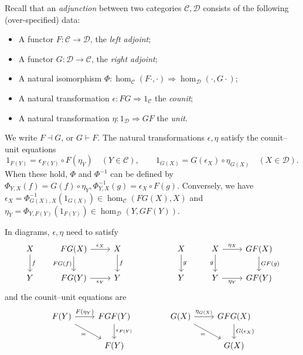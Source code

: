 \documentclass[a4paper,11pt]{article}
\theoremstyle{plain}
\theoremstyle{remark}
\newcommand{\mc}[1]{\mathcal{#1}}
\begin{document}
Recall that an \emph{adjunction} between two categories $\mc C, \mc D$ consists of the following (over-specified) data:
\begin{itemize}
  \item A functor $F\colon\mc C\to\mc D$, the \emph{left adjoint};
  \item A functor $G\colon\mc D \to \mc C$, the \emph{right adjoint};
  \item A natural isomorphism $\Phi \colon \hom_{\mc C}(F\cdot, \cdot) \Rightarrow \hom_{\mc D}(\cdot, G\cdot)$;
  \item A natural transformation $\epsilon \colon FG \Rightarrow 1_{\mc C}$ the \emph{counit};
  \item A natural transformation $\eta \colon 1_{\mc D} \Rightarrow GF$ the \emph{unit}.
\end{itemize}
We write $F \dashv G$, or $G \vdash F$.
The natural transformations $\epsilon, \eta$ satisfy the counit--unit equations
\[ 1_{F(Y)} = \epsilon_{F(Y)} \circ F(\eta_Y) \quad (Y\in \mc C), \qquad
1_{G(X)} = G(\epsilon_X) \circ \eta_{G(X)} \quad (X\in\mc D). \]
When these hold, $\Phi$ and $\Phi^{-1}$ can be defined by $\Phi_{Y,X}(f) = G(f)\circ\eta_Y, \Phi^{-1}_{Y,X}(g) = \epsilon_X\circ F(g)$.  Conversely, we have $\epsilon_X = \Phi^{-1}_{G(X), X}(1_{G(X)}) \in \hom_{\mc C}(FG(X), X)$ and $\eta_Y = \Phi_{Y,F(Y)}(1_{F(Y)}) \in \hom_{\mc D}(Y, GF(Y))$.

In diagrams, $\epsilon,\eta$ need to satisfy
\[ \begin{tikzcd}
X \arrow[d, "f"]    &
FG(X) \arrow[r, "\epsilon_X"] \arrow[d, "FG(f)"'] & X \arrow[d, "f"]
\\
Y    &
FG(Y) \arrow[r, "\epsilon_Y"']  & Y
\end{tikzcd}
\qquad\qquad\qquad
\begin{tikzcd}
X \arrow[d, "g"]    &
X \arrow[r, "\eta_X"] \arrow[d, "g"'] & GF(X) \arrow[d, "GF(g)"]
\\
Y    &
Y \arrow[r, "\eta_Y"']  & GF(Y)
\end{tikzcd}    \]
and the counit--unit equations are
\[ \begin{tikzcd}
F(Y) \arrow[r, "F(\eta_Y)"] \arrow[rd, "="'] & FGF(Y) \arrow[d, "\epsilon_{F(Y)}"] \\
& F(Y)
\end{tikzcd}
\qquad\qquad
\begin{tikzcd}
G(X) \arrow[r, "\eta_{G(X)}"] \arrow[rd, "="'] & GFG(X) \arrow[d, "G(\epsilon_X)"] \\
& G(X)
\end{tikzcd}
\]
\end{document}
